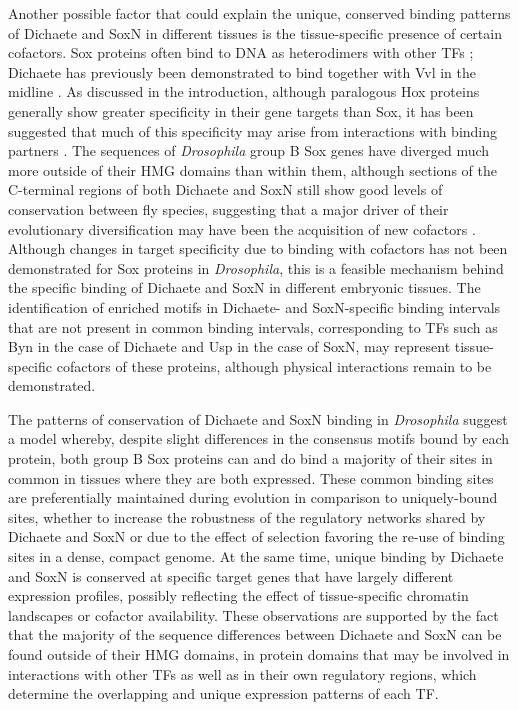 Another possible factor that could explain the unique, conserved binding patterns of Dichaete and SoxN in different tissues is the tissue-specific presence of certain cofactors. Sox proteins often bind to DNA as heterodimers with other TFs \citep{ambrosetti_synergistic_1997,archer_interaction_2011,bery_characterization_2013,bonneaud_sncf_2003}; Dichaete has previously been demonstrated to bind together with Vvl in the midline \citep{ma_functional_2000,soriano_drosophila_1998}. As discussed in the introduction, although paralogous Hox proteins generally show greater specificity in their gene targets than Sox, it has been suggested that much of this specificity may arise from interactions with binding partners \citep{chan_switching_1997,mann_chapter_2009,slattery_genome-wide_2011}. The sequences of \emph{Drosophila} group B Sox genes have diverged much more outside of their HMG domains than within them, although sections of the C-terminal regions of both Dichaete and SoxN still show good levels of conservation between fly species, suggesting that a major driver of their evolutionary diversification may have been the acquisition of new cofactors \citep{mckimmie_conserved_2005}. Although changes in target specificity due to binding with cofactors has not been demonstrated for Sox proteins in \emph{Drosophila}, this is a feasible mechanism behind the specific binding of Dichaete and SoxN in different embryonic tissues. The identification of enriched motifs in Dichaete- and SoxN-specific binding intervals that are not present in common binding intervals, corresponding to TFs such as Byn in the case of Dichaete and Usp in the case of SoxN, may represent tissue-specific cofactors of these proteins, although physical interactions remain to be demonstrated.

The patterns of conservation of Dichaete and SoxN binding in \emph{Drosophila} suggest a model whereby, despite slight differences in the consensus motifs bound by each protein, both group B Sox proteins can and do bind a majority of their sites in common in tissues where they are both expressed. These common binding sites are preferentially maintained during evolution in comparison to uniquely-bound sites, whether to increase the robustness of the regulatory networks shared by Dichaete and SoxN or due to the effect of selection favoring the re-use of binding sites in a dense, compact genome. At the same time, unique binding by Dichaete and SoxN is conserved at specific target genes that have largely different expression profiles, possibly reflecting the effect of tissue-specific chromatin landscapes or cofactor availability. These observations are supported by the fact that the majority of the sequence differences between Dichaete and SoxN can be found outside of their HMG domains, in protein domains that may be involved in interactions with other TFs as well as in their own regulatory regions, which determine the overlapping and unique expression patterns of each TF.

